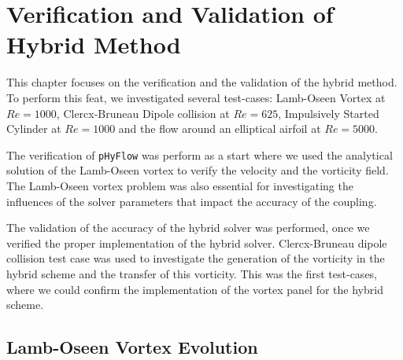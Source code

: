 \chapter{Verification and Validation of Hybrid Method}


This chapter focuses on the verification and the validation of the hybrid method. To perform this feat, we investigated several test-cases: Lamb-Oseen Vortex at $Re=1000$, Clercx-Bruneau Dipole collision at $Re=625$, Impulsively Started Cylinder at $Re=1000$ and the flow around an elliptical airfoil at $Re=5000$.

The verification of \texttt{pHyFlow} was perform as a start where we used the analytical solution of the Lamb-Oseen vortex to verify the velocity and the vorticity field. The Lamb-Oseen vortex problem was also essential for investigating the influences of the solver parameters that impact the accuracy of the coupling. 

The validation of the accuracy of the hybrid solver was performed, once we verified the proper implementation of the hybrid solver. Clercx-Bruneau dipole collision test case was used to investigate the generation of the vorticity in the hybrid scheme and the transfer of this vorticity. This was the first test-cases, where we could confirm the implementation of the vortex panel for the hybrid scheme.


%
%
%
%

\section{Lamb-Oseen Vortex Evolution}

